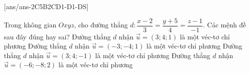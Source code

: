 \TNTF
{}[ans/ans-2C5B2CD1-D1-DS]
\begin{ex}%
	Trong không gian $Oxyz$, cho đường thẳng $d \colon \dfrac{x-2}{3}=\dfrac{y+5}{4}=\dfrac{z-1}{-1}$.  Các mệnh đề sau đây đúng hay sai?
	\choiceTF
	{ Đường thẳng $d$ nhận $\overrightarrow{u}=\left( 3;4;1 \right)$ là một véc-tơ chỉ phương}
	{ \True Đường thẳng $d$ nhận $\overrightarrow{u}=\left( -3;-4;1 \right)$ là một véc-tơ chỉ phương}
	{\True  Đường thẳng $d$ nhận $\overrightarrow{u}=\left( 3;4;-1 \right)$ là một véc-tơ chỉ phương}
	{ \True Đường thẳng $d$ nhận $\overrightarrow{u}=\left( -6;-8;2 \right)$ là một véc-tơ chỉ phương}
\end{ex}
